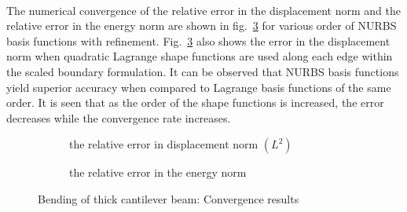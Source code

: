 \paragraph{}
The numerical convergence of the relative error in the displacement norm and the relative error in the energy norm are
    shown in fig.~\ref{iso_fig:cantilever_beam_convergence} for various order of NURBS basis functions with refinement.
Fig.~\ref{iso_fig:cantilever_beam_convergence} also shows the error in the displacement norm when quadratic Lagrange shape
    functions are used along each edge within the scaled boundary formulation.
It can be observed that NURBS basis functions yield superior accuracy when compared to Lagrange basis functions of the
    same order.
It is seen that as the order of the shape functions is increased, the error decreases while the convergence rate increases.

\begin{figure}
    \begin{subfigure}[b]{1\linewidth}
        \centering
        \scalebox{0.7}{
            
        }
        \label{iso_fig:cantilever_beam_displacement_convergence}
        \caption{the relative error in displacement norm $(L^2)$}
    \end{subfigure}
    
    \begin{subfigure}[b]{1\linewidth}
        \centering
        \scalebox{0.7}{
            
        }
        \label{iso_fig:cantilever_beam_energy_convergence}
        \caption{the relative error in the energy norm}
    \end{subfigure}
\caption{Bending of thick cantilever beam: Convergence results}
\label{iso_fig:cantilever_beam_convergence}
\end{figure}

\pagebreak